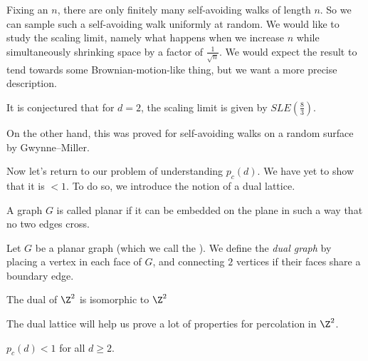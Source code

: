 \documentclass[a4paper]{article}
\begin{document}
Fixing an $n$, there are only finitely many self-avoiding walks of length $n$. So we can sample such a self-avoiding walk uniformly at random. We would like to study the scaling limit, namely what happens when we increase $n$ while simultaneously shrinking space by a factor of $\frac{1}{\sqrt{n}}$. We would expect the result to tend towards some Brownian-motion-like thing, but we want a more precise description.

It is conjectured that for $d = 2$, the scaling limit is given by $SLE(\frac{8}{3})$.

On the other hand, this was proved for self-avoiding walks on a random surface by Gwynne--Miller. %

Now let's return to our problem of understanding $p_c(d)$. We have yet to show that it is $ < 1$. To do so, we introduce the notion of a dual lattice.

\begin{defi}
  A graph $G$ is called planar if it can be embedded on the plane in such a way that no two edges cross.
\end{defi}

\begin{defi}
  Let $G$ be a planar graph (which we call the ). We define the \emph{dual graph} by placing a vertex in each face of $G$, and connecting $2$ vertices if their faces share a boundary edge.
\end{defi}

\begin{eg}
  The dual of $\Z^2$ is isomorphic to $\Z^2$ %
\end{eg}
The dual lattice will help us prove a lot of properties for percolation in $\Z^2$.

\begin{lemma}
  $p_c(d) < 1$ for all $d \geq 2$.
\end{lemma}
\end{document}
